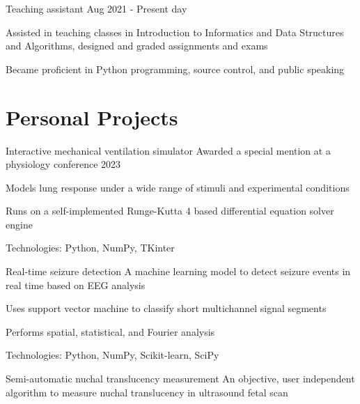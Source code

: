 \documentclass{resume}
\begin{document}
    \resumeSubheading
    {Teaching assistant}{}
    {}{Aug 2021 - Present day}
    \vspace{-5mm}
    \resumeItemListStart
    \item
    {Assisted in teaching classes in Introduction to Informatics and Data Structures and Algorithms,
        designed and graded assignments and exams}
    \item {Became proficient in Python programming, source control, and public speaking}
    \resumeItemListEnd
    \resumeSubHeadingListEnd

    \vspace{-5mm}


    \section{\textbf{Personal Projects}} \label{sec:projects}
    \resumeSubHeadingListStart
    \resumeProject
    {Interactive mechanical ventilation simulator} %
    {Awarded a special mention at a physiology conference 2023} %
    {} %

    \resumeItemListStart
    \item {Models lung response under a wide range of stimuli and experimental conditions}
    \item {Runs on a self-implemented Runge-Kutta 4 based differential equation solver engine}
    \item {Technologies: Python, NumPy, TKinter}
    \resumeItemListEnd

    \resumeProject
    {Real-time seizure detection} %
    {A machine learning model to detect seizure events in real time based on EEG analysis} %
    {} %

    \resumeItemListStart
    \item {Uses support vector machine to classify short multichannel signal segments}
    \item {Performs spatial, statistical, and Fourier analysis}
    \item {Technologies: Python, NumPy, Scikit-learn, SciPy}
    \resumeItemListEnd

    \resumeProject
    {Semi-automatic nuchal translucency measurement} %
    {An objective, user independent algorithm to measure nuchal translucency in ultrasound fetal scan}
    {} %
\end{document}
